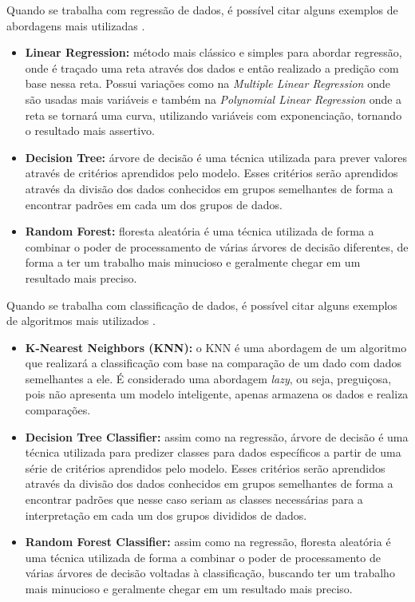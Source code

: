 Quando se trabalha com regressão de dados, é possível citar alguns exemplos de abordagens mais utilizadas \cite{machineLearningTensorFlow}.
\begin{itemize}
    \item \textbf{Linear Regression:} método mais clássico e simples para abordar regressão, onde é traçado uma reta através dos dados e então realizado a predição com base nessa reta. Possui variações como na \emph{Multiple Linear Regression} onde são usadas mais variáveis e também na \emph{Polynomial Linear Regression} onde a reta se tornará uma curva, utilizando variáveis com exponenciação, tornando o resultado mais assertivo.
    \item \textbf{Decision Tree:} árvore de decisão é uma técnica utilizada para prever valores através de critérios aprendidos pelo modelo. Esses critérios serão aprendidos através da divisão dos dados conhecidos em grupos semelhantes de forma a encontrar padrões em cada um dos grupos de dados.
    \item \textbf{Random Forest:} floresta aleatória é uma técnica utilizada de forma a combinar o poder de processamento de várias árvores de decisão diferentes, de forma a ter um trabalho mais minucioso e geralmente chegar em um resultado mais preciso.
\end{itemize}

Quando se trabalha com classificação de dados, é possível citar alguns exemplos de algoritmos mais utilizados \cite{machineLearningPython}.
\begin{itemize}
    \item \textbf{K-Nearest Neighbors (KNN):} o KNN é uma abordagem de um algoritmo que realizará a classificação com base na comparação de um dado com dados semelhantes a ele. É considerado uma abordagem \emph{lazy}, ou seja, preguiçosa, pois não apresenta um modelo inteligente, apenas armazena os dados e realiza comparações.
    \item \textbf{Decision Tree Classifier:} assim como na regressão, árvore de decisão é uma técnica utilizada para predizer classes para dados específicos a partir de uma série de critérios aprendidos pelo modelo. Esses critérios serão aprendidos através da divisão dos dados conhecidos em grupos semelhantes de forma a encontrar padrões que nesse caso seriam as classes necessárias para a interpretação em cada um dos grupos divididos de dados.
    \item \textbf{Random Forest Classifier:} assim como na regressão, floresta aleatória é uma técnica utilizada de forma a combinar o poder de processamento de várias árvores de decisão voltadas à classificação, buscando ter um trabalho mais minucioso e geralmente chegar em um resultado mais preciso.
\end{itemize}

